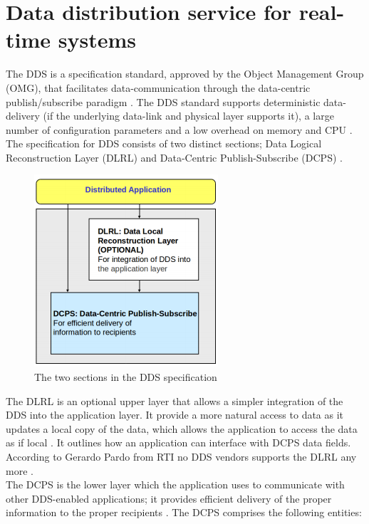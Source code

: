 \documentclass[Main]{subfiles}
\begin{document}
\section{Data distribution service for real-time systems}
The DDS is a specification standard, approved by the Object Management Group (OMG), that facilitates data-communication through the data-centric publish/subscribe paradigm \cite{RTI}. The DDS standard supports deterministic data-delivery (if the underlying data-link and physical layer supports it), a large number of configuration parameters and a low overhead on memory and CPU \cite{DDS-slides}.\\
The specification for DDS consists of two distinct sections; Data Logical Reconstruction Layer (DLRL) and Data-Centric Publish-Subscribe (DCPS) \cite{DDS-slides}.

\begin{figure}[H]
\centering
\includegraphics[scale=0.8]{Figure/DLRLandDCPS.png}
\caption{The two sections in the DDS specification \cite{DDS-slides}}
\label{Fig:DLRL}
\end{figure}

The DLRL is an optional upper layer that allows a simpler integration of the DDS into the application layer. It provide a more natural access to data as it updates a local copy of the data, which allows the application to access the data as if local \cite{DDS-slides}. It outlines how an application can interface with DCPS data fields. According to Gerardo Pardo from RTI no DDS vendors supports the DLRL any more \cite{DLRL-support}.\\
The DCPS is the lower layer which the application uses to communicate with other DDS-enabled applications; it provides efficient delivery of the proper information to the proper recipients \cite{wiki-DDS}. The DCPS comprises the following entities:
\end{document}
